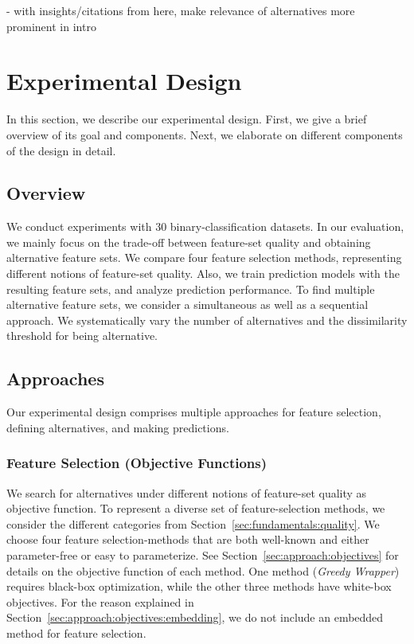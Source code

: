 \documentclass{article}
\theoremstyle{definition}
\begin{document}
- with insights/citations from here, make relevance of alternatives more prominent in intro

\section{Experimental Design}
\label{sec:experimental-design}

In this section, we describe our experimental design.
First, we give a brief overview of its goal and components.
Next, we elaborate on different components of the design in detail.

\subsection{Overview}
\label{sec:experimental-design:overview}

We conduct experiments with 30 binary-classification datasets.
In our evaluation, we mainly focus on the trade-off between feature-set quality and obtaining alternative feature sets.
We compare four feature selection methods, representing different notions of feature-set quality.
Also, we train prediction models with the resulting feature sets, and analyze prediction performance.
To find multiple alternative feature sets, we consider a simultaneous as well as a sequential approach.
We systematically vary the number of alternatives and the dissimilarity threshold for being alternative.

\subsection{Approaches}
\label{sec:experimental-design:approaches}

Our experimental design comprises multiple approaches for feature selection, defining alternatives, and making predictions.

\subsubsection{Feature Selection (Objective Functions)}
\label{sec:experimental-design:approaches:feature-selection}

We search for alternatives under different notions of feature-set quality as objective function.
To represent a diverse set of feature-selection methods, we consider the different categories from Section~\ref{sec:fundamentals:quality}.
We choose four feature selection-methods that are both well-known and either parameter-free or easy to parameterize.
See Section~\ref{sec:approach:objectives} for details on the objective function of each method.
One method (\emph{Greedy Wrapper}) requires black-box optimization, while the other three methods have white-box objectives.
For the reason explained in Section~\ref{sec:approach:objectives:embedding}, we do not include an embedded method for feature selection.
\end{document}

